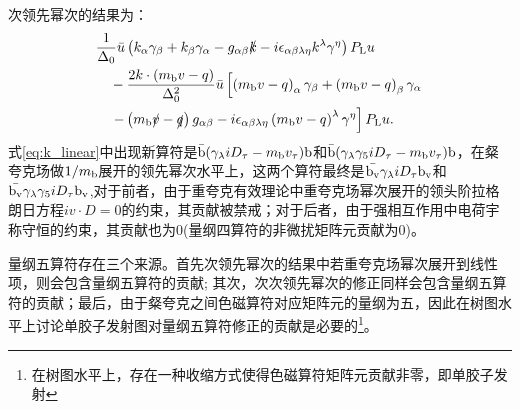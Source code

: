 次领先幂次的结果为：
\begin{equation}
    \begin{aligned}
    & \frac{1}{\Delta_0} \bar{u}\left(k_\alpha \gamma_\beta+k_\beta \gamma_\alpha-g_{\alpha \beta} \slashed{k}-i \epsilon_{\alpha \beta \lambda \eta} k^\lambda \gamma^\eta\right) P_{\mathrm{L}} u \\
    & \quad-\frac{2 k \cdot\left(m_{\mathrm{b}} v-q\right)}{\Delta_0^2} \bar{u}\left[\left(m_{\mathrm{b}} v-q\right)_\alpha \gamma_\beta+\left(m_{\mathrm{b}} v-q\right)_\beta \gamma_\alpha\right. \\
    & \left.\quad-\left(m_{\mathrm{b}} \slashed{v}-\slashed{q}\right) g_{\alpha \beta}-i \epsilon_{\alpha \beta \lambda \eta}\left(m_{\mathrm{b}} v-q\right)^\lambda \gamma^\eta\right] P_{\mathrm{L}} u .
    \end{aligned}
    \label{eq:k_linear}
\end{equation}
式\eqref{eq:k_linear}中出现新算符是$\mathrm{\bar{b}}(\gamma_\lambda i D_\tau -m_{\mathrm{b}}v_{\tau})\mathrm{b}$和$\mathrm{\bar{b}}(\gamma_\lambda \gamma_5 i D_\tau -m_{\mathrm{b}}v_{\tau})\mathrm{b}$，在粲夸克场做$1/m_{\mathrm{b}}$展开的领先幂次水平上，这两个算符最终是$\mathrm{\bar{b_{v}}} \gamma_\lambda i D_\tau\mathrm{ b_{v}}$和$\mathrm{\bar{b_{v}}}\gamma_\lambda \gamma_5 i D_\tau\mathrm{b_{v}}$,对于前者，由于重夸克有效理论中重夸克场幂次展开的领头阶拉格朗日方程$i v\cdot D=0$的约束，其贡献被禁戒；对于后者，由于强相互作用中电荷宇称守恒的约束，其贡献也为0(量纲四算符的非微扰矩阵元贡献为0)。


量纲五算符存在三个来源。首先次领先幂次的结果中若重夸克场幂次展开到线性项，则会包含量纲五算符的贡献; 其次，次次领先幂次的修正同样会包含量纲五算符的贡献；最后，由于粲夸克之间色磁算符对应矩阵元的量纲为五，因此在树图水平上讨论单胶子发射图对量纲五算符修正的贡献是必要的\footnote{在树图水平上，存在一种收缩方式使得色磁算符矩阵元贡献非零，即单胶子发射}。

